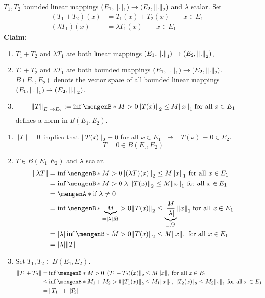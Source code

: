 \begin{satz}

	$T_1,T_2$ bounded linear mappings $(E_1,\norm{.}_1) \to (E_2,\norm{.}_2)$ and $\lambda$ scalar. Set
	\begin{align*}
		(T_1+T_2)(x) &= T_1(x) + T_2(x) \qquad x \in E_1 \\
		( \lambda T_1)(x) &= \lambda T_1(x) \qquad x \in E_1
	\end{align*}
	\textbf{Claim:} \text{    }     
	\begin{enumerate}[(1)]
		\item $T_1 + T_2$ and $\lambda T_1$ are both linear mappings $(E_1,\norm{.}_1) \to (E_2,\norm{.}_2)$,
		\item $T_1 + T_2$ and $\lambda T_1$ are both bounded mappings $(E_1,\norm{.}_1) \to (E_2,\norm{.}_2)$. \\
		$B(E_1,E_2)$ denote the vector space of all bounded linear mappings $(E_1,\norm{.}_1) \to (E_2,\norm{.}_2)$.
		\item \[
			\norm{T}_{E_1 \to E_2} := \inf \set[M > 0]{\norm{T(x)}_2 \leq M \norm{x}_1 \text{ for all }x \in E_1}
		\]
		defines a norm in $B(E_1,E_2)$.
	\end{enumerate}
\end{satz}
\begin{beweis}
	\begin{enumerate}[(1)]
		\item $\norm{T}=0$ implies that $\norm{T(x)}_2 = 0$ for all $x \in E_1$ $ \,\, \Rightarrow \,\, $ $T(x) = 0 \in E_2$.
		\[
			T = 0 \in B(E_1,E_2)
		\]
		\item $T \in B(E_1,E_2)$ and $\lambda$ scalar. 
		\begin{align*}
			\norm{\lambda T} &= \inf \set[M >0]{\norm{(\lambda T)(x)}_2 \leq M \norm{x}_1 \text{ for all }x \in E_1} \\
			&= \inf \set[M>0]{\abs{\lambda} \norm{T(x)}_2 \leq M \norm{x}_1 \text{ for all }x \in E_1} \\
			&= \set{\text{if }\lambda \neq 0} \\
			&= \inf \set[\underset{= \abs{\lambda} \tilde M}{\underbrace{M}}>0]{\norm{T(x)}_2 \leq \underset{= \tilde M}{\underbrace{\frac{M}{\abs{\lambda}}}}\norm{x}_1 \text{ for all }x \in E_1} \\
			&= \abs{\lambda} \inf \set[\tilde M >0]{ \norm{T(x)}_2 \leq \tilde M \norm{x}_1 \text{ for all }x \in E_1} \\
			&= \abs{\lambda} \norm{T}
		\end{align*}
		\item Set $T_1,T_2 \in B(E_1,E_2)$.
		\begin{align*}
			\norm{T_1+ T_2} &= \inf \set[M>0]{\norm{(T_1+T_2)(x)}_2 \leq M \norm{x}_1 \text{ for all }x \in E_1} \\
			&\leq \inf \set[M_1 + M_2>0]{\norm{T_1(x)}_2 \leq M_1 \norm{x}_1, \, \norm{T_2(x)}_2 \leq M_2 \norm{x}_1 \text{ for all }x \in E_1} \\
			&= \norm{T_1} + \norm{T_2}
		\end{align*}
	\end{enumerate}
\end{beweis}
